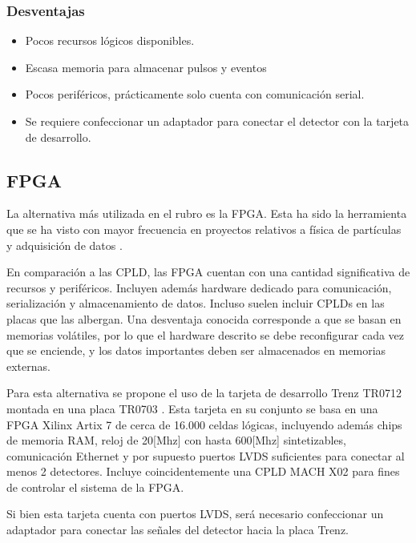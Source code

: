 \subsubsection*{Desventajas}
\begin{itemize}
    \item Pocos recursos lógicos disponibles.
    \item Escasa memoria para almacenar pulsos y eventos
    \item Pocos periféricos, prácticamente solo cuenta con comunicación serial.
    \item Se requiere confeccionar un adaptador para conectar el detector con la tarjeta de desarrollo.
\end{itemize}

\newpage
\subsection{FPGA}
\par La alternativa más utilizada en el rubro es la FPGA. Esta ha sido la herramienta que se ha visto con mayor frecuencia en proyectos relativos a física de partículas y adquisición de datos \cite{Gonzalez2020EstadoTitulacion}. 
\par En comparación a las CPLD, las FPGA cuentan con una cantidad significativa de recursos y periféricos. Incluyen además hardware dedicado para comunicación, serialización y almacenamiento de datos. Incluso suelen incluir CPLDs en las placas que las albergan. Una desventaja conocida corresponde a que se basan en memorias volátiles, por lo que el hardware descrito se debe reconfigurar cada vez que se enciende, y los datos importantes deben ser almacenados en memorias externas.

\par Para esta alternativa se propone el uso de la tarjeta de desarrollo Trenz TR0712 \cite{TrenzElectronic2019TR07012Wiki} montada en una placa TR0703 \cite{TrenzElectronic2019TR0703Wiki}. Esta tarjeta en su conjunto se basa en una FPGA Xilinx Artix 7 \cite{Xilinx20107DS180} de cerca de 16.000 celdas lógicas, incluyendo además chips de memoria RAM, reloj de 20[Mhz] con hasta 600[Mhz] sintetizables, comunicación Ethernet y por supuesto puertos LVDS suficientes para conectar al menos 2 detectores. Incluye coincidentemente una CPLD MACH X02 para fines de controlar el sistema de la FPGA.

\par Si bien esta tarjeta cuenta con puertos LVDS, será necesario confeccionar un adaptador para conectar las señales del detector hacia la placa Trenz.

